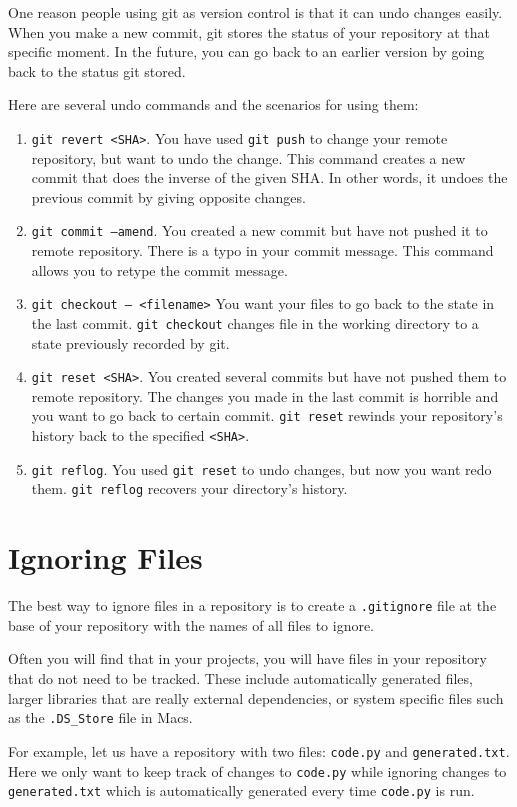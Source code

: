 \documentclass[12pt]{report}
\newcommand\code[1]{{\color{blue}\texttt{#1}}}
\begin{document}
One reason people using git as version control is that it can undo changes easily. When you make a new commit, git stores the status of your repository at that specific moment. In the future, you can go back to an earlier version by going back to the status git stored.

Here are several undo commands and the scenarios for using them:

\begin{enumerate}
  \item \code{git revert <SHA>}. You have used \code{git push} to change your remote repository, but want to undo the change. This command creates a new commit that does the inverse of the given SHA. In other words, it undoes the previous commit by giving opposite changes.
  \item \code{git commit --amend}. You created a new commit but have not pushed it to remote repository. There is a typo in your commit message. This command allows you to retype the commit message.
  \item \code{git checkout -- <filename>} You want your files to go back to the state in the last commit. \code{git checkout} changes file in the working directory to a state previously recorded by git.
  \item \code{git reset <SHA>}. You created several commits but have not pushed them to remote repository. The changes you made in the last commit is horrible and you want to go back to certain commit. \code{git reset} rewinds your repository's history back to the specified \code{<SHA>}.
  \item \code{git reflog}. You used \code{git reset} to undo changes, but now you want redo them. \code{git reflog} recovers your directory's history.
\end{enumerate}
\section{Ignoring Files}

The best way to ignore files in a repository is to create a \code{.gitignore} file at the base of your repository with the names of all files to ignore.

Often you will find that in your projects, you will have files in your repository that do not need to be tracked.  These include automatically generated files, larger libraries that are really external dependencies, or system specific files such as the \code{.DS\_Store} file in Macs.

For example, let us have a repository with two files: \code{code.py} and \code{generated.txt}.  Here we only want to keep track of changes to \texttt{code.py} while ignoring changes to \texttt{generated.txt} which is automatically generated every time \texttt{code.py} is run.
\end{document}

